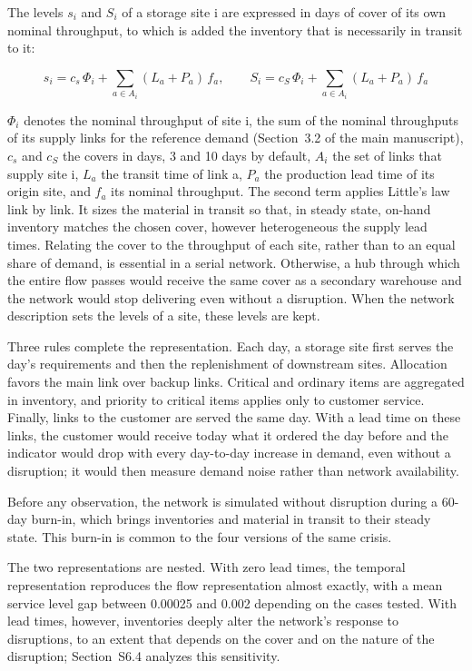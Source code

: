 The levels $s_{i}$ and $S_{i}$ of a storage site i are expressed in days of cover of its own nominal throughput, to which is added the inventory that is necessarily in transit to it:

\begin{equation}
s_i = c_s\,\Phi_i + \sum_{a \in A_i} (L_a + P_a)\, f_a, \qquad S_i = c_S\,\Phi_i + \sum_{a \in A_i} (L_a + P_a)\, f_a
\label{eq:S1}
\end{equation}

$\Phi_{i}$ denotes the nominal throughput of site i, the sum of the nominal throughputs of its supply links for the reference demand (Section~3.2 of the main manuscript), $c_{s}$ and $c_{S}$ the covers in days, 3 and 10 days by default, $A_{i}$ the set of links that supply site i, $L_{a}$ the transit time of link a, $P_{a}$ the production lead time of its origin site, and $f_{a}$ its nominal throughput. The second term applies Little's law \citep{little1961} link by link. It sizes the material in transit so that, in steady state, on-hand inventory matches the chosen cover, however heterogeneous the supply lead times. Relating the cover to the throughput of each site, rather than to an equal share of demand, is essential in a serial network. Otherwise, a hub through which the entire flow passes would receive the same cover as a secondary warehouse and the network would stop delivering even without a disruption. When the network description sets the levels of a site, these levels are kept.

Three rules complete the representation. Each day, a storage site first serves the day's requirements and then the replenishment of downstream sites. Allocation favors the main link over backup links. Critical and ordinary items are aggregated in inventory, and priority to critical items applies only to customer service. Finally, links to the customer are served the same day. With a lead time on these links, the customer would receive today what it ordered the day before and the indicator would drop with every day-to-day increase in demand, even without a disruption; it would then measure demand noise rather than network availability.

Before any observation, the network is simulated without disruption during a 60-day burn-in, which brings inventories and material in transit to their steady state. This burn-in is common to the four versions of the same crisis.

The two representations are nested. With zero lead times, the temporal representation reproduces the flow representation almost exactly, with a mean service level gap between 0.00025 and 0.002 depending on the cases tested. With lead times, however, inventories deeply alter the network's response to disruptions, to an extent that depends on the cover and on the nature of the disruption; Section~S6.4 analyzes this sensitivity.

